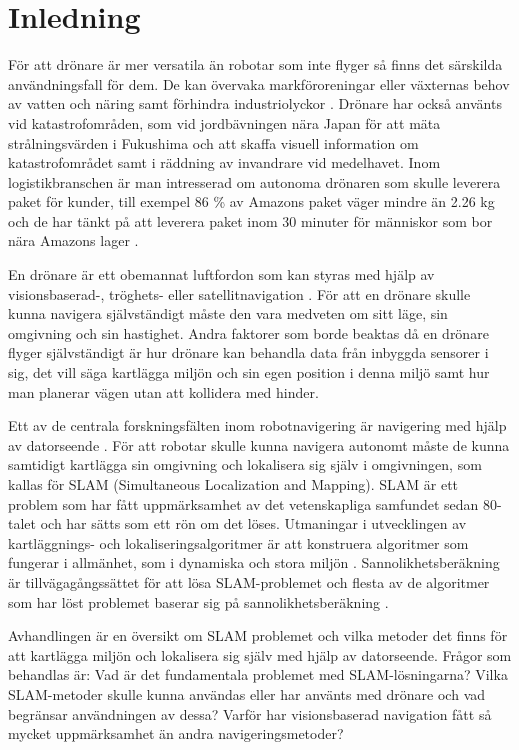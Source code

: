 \chapter{Inledning}

För att drönare är mer versatila än robotar som inte flyger så finns det särskilda användningsfall för dem. De kan övervaka markföroreningar eller växternas behov av vatten och näring samt förhindra industriolyckor \citep{crowdsurveillance}. Drönare har också använts vid katastrofområden, som vid jordbävningen nära Japan för att mäta strålningsvärden i Fukushima och att skaffa visuell information om katastrofområdet samt i räddning av invandrare vid medelhavet. Inom logistikbranschen är man intresserad om autonoma drönaren som skulle leverera paket för kunder, till exempel 86 \% av Amazons paket väger mindre än 2.26 kg och de har tänkt på att leverera paket inom 30 minuter för människor som bor nära Amazons lager \citep{cbsnews}.

En drönare är ett obemannat luftfordon som kan styras med hjälp av visionsbaserad-, tröghets- eller satellitnavigation \citep{geospatial}. För att en drönare skulle kunna navigera självständigt måste den vara medveten om sitt läge, sin omgivning och sin hastighet. Andra faktorer som borde beaktas då en drönare flyger självständigt är hur drönare kan behandla data från inbyggda sensorer i sig, det vill säga kartlägga miljön och sin egen position i denna miljö samt hur man planerar vägen utan att kollidera med hinder.

Ett av de centrala forskningsfälten inom robotnavigering är navigering med hjälp av datorseende \citep{982903}. För att robotar skulle kunna navigera autonomt måste de kunna samtidigt kartlägga sin omgivning och lokalisera sig själv i omgivningen, som kallas för SLAM (Simultaneous Localization and Mapping). SLAM är ett problem som har fått uppmärksamhet av det vetenskapliga samfundet sedan 80-talet och har sätts som ett rön om det löses. Utmaningar i utvecklingen av kartläggnings- och lokaliseringsalgoritmer är att konstruera algoritmer som fungerar i allmänhet, som i dynamiska och stora miljön \citep{realslamproblem}. Sannolikhetsberäkning är tillvägagångssättet för att lösa SLAM-problemet och flesta av de algoritmer som har löst problemet baserar sig på sannolikhetsberäkning \citep{ProbabilisticRobotics}.

Avhandlingen är en översikt om SLAM problemet och vilka metoder det finns för att kartlägga miljön och lokalisera sig själv med hjälp av datorseende. Frågor som behandlas är: Vad är det fundamentala problemet med SLAM-lösningarna? Vilka SLAM-metoder skulle kunna användas eller har använts med drönare och vad begränsar användningen av dessa? Varför har visionsbaserad navigation fått så mycket uppmärksamhet än andra navigeringsmetoder?

